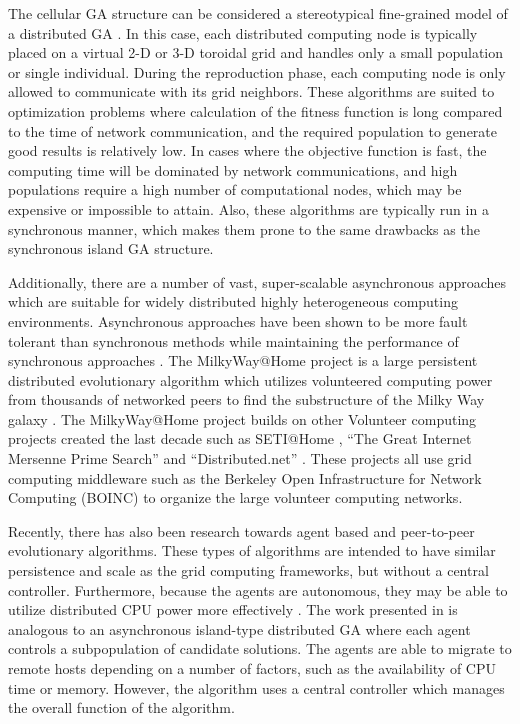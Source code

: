     The cellular GA structure can be considered a stereotypical fine-grained
      model of a distributed GA \cite{Cantu-Paz1998, Schoneveld1996}. 
    In this case, each distributed computing node is typically placed on a
      virtual 2-D or 3-D toroidal grid and handles only a small population or
      single individual. 
    During the reproduction phase, each computing node is only allowed to
      communicate with its grid neighbors. 
    These algorithms are suited to optimization problems where calculation of
      the fitness function is long compared to the time of network communication,
      and the required population to generate good results is
      relatively low. 
    In cases where the objective function is fast, the computing time will be
      dominated by network communications, and high populations require a high
      number of computational nodes, which may be expensive or impossible to
      attain. 
    Also, these algorithms are typically run in a synchronous manner, which
      makes them prone to the same drawbacks as the synchronous island GA
      structure. 

    Additionally, there are a number of vast, super-scalable asynchronous
      approaches which are suitable for widely distributed highly heterogeneous
      computing environments. 
    Asynchronous approaches have been shown to be more fault tolerant than 
      synchronous methods while maintaining the performance of synchronous approaches
      \cite{Lewis2009}. 
    The MilkyWay@Home project is a large persistent distributed evolutionary
      algorithm which utilizes volunteered computing power from thousands of
      networked peers to find the substructure of the Milky Way galaxy
      \cite{Cole2010}. 
    The MilkyWay@Home project builds on other Volunteer computing projects
      created the last decade such as SETI@Home \cite{Anderson2002}, ``The Great
      Internet Mersenne Prime Search'' \cite{mersenne_website} and
      ``Distributed.net'' \cite{distributednet_website}. 
    These projects all use grid computing middleware such as the Berkeley Open
      Infrastructure for Network Computing (BOINC) \cite{Anderson2004} to
      organize the large volunteer computing networks. 

    Recently, there has also been research towards agent based and peer-to-peer
      evolutionary algorithms. 
    These types of algorithms are intended to have similar persistence and
      scale as the grid computing frameworks, but without a central controller.
    Furthermore, because the agents are autonomous, they may be able to
      utilize distributed CPU power more effectively \cite{Laredo2010, Lee2011}. 
    The work presented in \cite{Lee2011} is analogous to an asynchronous
      island-type distributed GA where each agent controls a subpopulation of
      candidate solutions. 
    The agents are able to migrate to remote hosts depending on a number of
      factors, such as the availability of CPU time or memory. 
    However, the algorithm uses a central controller which manages the overall
      function of the algorithm.

